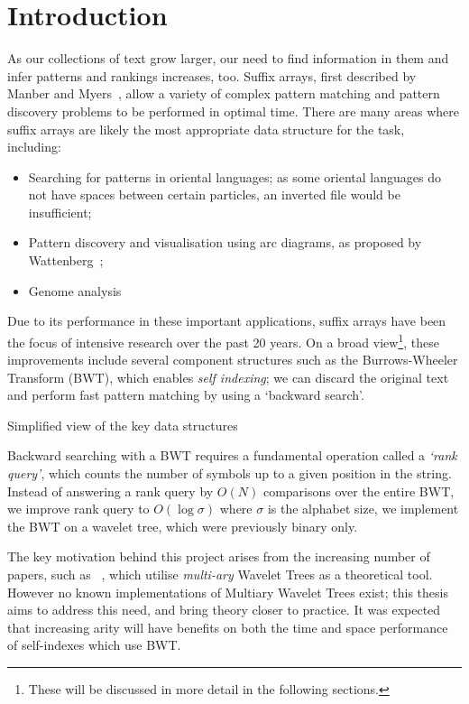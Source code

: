 \section{Introduction}

As our collections of text grow larger, our need to find information in them
and infer patterns and rankings increases, too. Suffix arrays, first
described by Manber and Myers~\cite{manber1993}, allow a variety of complex 
pattern matching and pattern discovery problems to be performed in optimal time. 
There are many areas where suffix arrays are likely the most appropriate data 
structure for the task, including:

\begin{itemize}
\item
	Searching for patterns in oriental languages; as some oriental languages
    do not have spaces between certain particles, an inverted file would be
    insufficient;
\item
	Pattern discovery and visualisation using arc diagrams, as proposed by
    Wattenberg~\cite{arc:wattenberg2002};
\item
	Genome analysis~\cite{genome:abouelhoda2004, genome:flicek2009}
\end{itemize}

Due to its performance in these important applications, suffix arrays have been
the focus of intensive research over the past 20 years. On a broad
view\footnote{These will be discussed in more detail in the following 
sections.}, these improvements include several component structures such as the 
Burrows-Wheeler Transform (BWT), which enables \emph{self indexing}; we can 
discard the original text and perform fast pattern matching by using a `backward 
search'.

			{Simplified view of the key data structures}

Backward searching with a BWT requires a fundamental operation called a 
\emph{`rank query'}, which counts the number of symbols up to a given position in the 
string. Instead of answering a rank query by $O(N)$ comparisons over the
entire BWT, we improve rank query to $O(\log \sigma)$ where $\sigma$ 
is the alphabet size, we implement the BWT on a wavelet tree, which were 
previously binary only. 

The key motivation behind this project arises from the increasing number of
papers, such as ~\cite{yu2009}, which utilise \emph{multi-ary} Wavelet
Trees as a theoretical tool. However no known implementations of Multiary 
Wavelet Trees exist; this thesis aims to address this need, and bring theory 
closer to practice. It was expected that increasing arity will have benefits
on both the time and space performance of self-indexes which use BWT.

